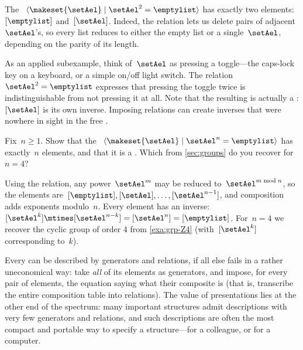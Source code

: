 \begin{example}
    \label{exa:presentation-toggle}
    The ~$\langle \makeset{\setAel} \mid \setAel^2 = \emptylist \rangle$ has exactly two elements: $[\emptylist]$ and~$[\setAel]$.
    Indeed, the relation lets us delete pairs of adjacent~$\setAel$'s, so every list reduces to either the empty list or a single~$\setAel$, depending on the parity of its length.

    As an applied subexample, think of~$\setAel$ as pressing a toggle---the caps-lock key on a keyboard, or a simple on/off light switch.
    The relation~$\setAel^2 = \emptylist$ expresses that pressing the toggle twice is indistinguishable from not pressing it at all.
    Note that the resulting  is actually a : $[\setAel]$ is its own inverse.
    Imposing relations can create inverses that were nowhere in sight in the free .
\end{example}

\begin{exercise}
    \label{ex:presentation-cyclic}
    Fix~$n \geq 1$.
    Show that the ~$\langle \makeset{\setAel} \mid \setAel^n = \emptylist \rangle$ has exactly~$n$ elements, and that it is a .
    Which  from \cref{sec:groups} do you recover for~$n = 4$?
\end{exercise}
\begin{solution}
    Using the relation, any power~$\setAel^m$ may be reduced to~$\setAel^{m \bmod n}$, so the elements are~$[\emptylist], [\setAel], \dots, [\setAel^{n-1}]$, and composition adds exponents modulo~$n$.
    Every element has an inverse: $[\setAel^k] \mtimes [\setAel^{n-k}] = [\setAel^n] = [\emptylist]$.
    For~$n = 4$ we recover the cyclic group of order 4 from \cref{exa:grp-Z4} (with~$[\setAel^k]$ corresponding to~$k$).
\end{solution}

\begin{remark}
    \label{rem:every-monoid-has-presentation}
    Every  can be described by generators and relations, if all else fails in a rather uneconomical way: take \emph{all} of its elements as generators, and impose, for every pair of elements, the equation saying what their composite is (that is, transcribe the entire composition table into relations).
    The value of presentations lies at the other end of the spectrum: many important structures admit descriptions with very few generators and relations, and such descriptions are often the most compact and portable way to specify a structure---for a colleague, or for a computer.
\end{remark}

